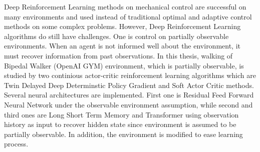 Deep Reinforcement Learning methods on mechanical control are successful on many environments and used instead of traditional optimal and adaptive control methods on some complex problems. 
However, Deep Reinforcement Learning algorithms do still have challenges. 
One is control on partially observable environments. 
When an agent is not informed well about the environment, it must recover information from past observations. 
In this thesis, walking of Bipedal Walker (OpenAI GYM) environment, 
which is partially observable, 
is studied by two continious actor-critic reinforcement learning algorithms which are Twin Delayed Deep Determinstic Policy Gradient and Soft Actor Critic methods.
Several neural architectures are implemented. 
First one is Residual Feed Forward Neural Network under the observable environment assumption, 
while second and third ones are Long Short Term Memory and Transformer using observation history as input to recover hidden state since environment is assumed to be partially observable. 
In addition, the environment is modified to ease learning process. 
